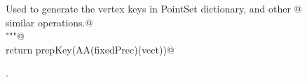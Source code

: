 \documentclass[11pt,oneside]{article}	%
\begin{document}
\begin{flushleft}
\begin{list}{}{}
\mbox{}\verb@   Used to generate the vertex keys in PointSet dictionary, and other @\\
\mbox{}\verb@   similar operations.@\\
\mbox{}\verb@   """@\\
\mbox{}\verb@   return prepKey(AA(fixedPrec)(vect))@\\
\mbox{}\verb@@{\NWsep}
\end{list}
\vspace{-1ex}
\footnotesize\addtolength{\baselineskip}{-1ex}
\begin{list}{}{\setlength{\itemsep}{-\parsep}\setlength{\itemindent}{-\leftmargin}}
\item {\NWtxtMacroNoRef}.
\end{list}
\end{flushleft}




\end{document}
